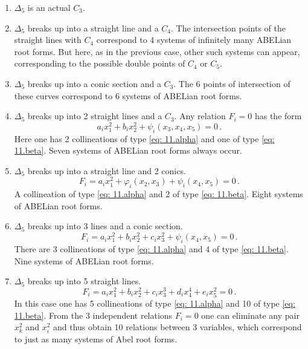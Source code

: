 \documentclass[leqno]{article}
\begin{document}
\begin{enumerate}[label=\arabic*)]
	\item $\Delta_5$ is an actual $C_3$.
	\item $\Delta_5$ breaks up into a straight line and a $C_4$. The intersection points of the straight lines with $C_4$ correspond to 4 systems of infinitely many ABELian root forms. But here, as in the previous case, other such systems can appear, corresponding to the possible double points of $C_4$ or $C_5$.
	\item $\Delta_5$ breaks up into a conic section and a $C_3$. The 6 points of intersection of these curves correspond to 6 systems of ABELian root forms.
	\item $\Delta_5$ breaks up into 2 straight lines and a $C_3$. Any relation $F_i=0$ has the form
	\begin{equation}\label{eq: 11.c}
	a_i x_1^2 + b_i x_2^2 + \psi_i(x_3, x_4, x_5) = 0 \, . \tag{c}
	\end{equation}
	Here one has 2 collineations of type \eqref{eq: 11.alpha} and one of type \eqref{eq: 11.beta}. Seven systems of ABELian root forms always occur.
	\item $\Delta_5$ breaks up into a straight line and 2 conics.
	\begin{equation}\label{eq: 11.d}
	    F_i = a_i x_1^2 + \varphi_i(x_2, x_3) + \psi_i(x_4, x_5) = 0 \, . \tag{d}
	\end{equation}
	A collineation of type \eqref{eq: 11.alpha} and 2 of type \eqref{eq: 11.beta}. Eight systems of ABELian root forms.
	\item $\Delta_5$ breaks up into 3 lines and a conic section.
	\begin{equation}\label{eq: 11.e}
	    F_i = a_i x_1^2 + b_i x_2^2 + c_i x_3^2 + \psi_i(x_4, x_5) = 0 \, . \tag{e}
	\end{equation}
	There are 3 collineations of type \eqref{eq: 11.alpha} and 4 of type \eqref{eq: 11.beta}. Nine systems of ABELian root forms.
	\item $\Delta_5$ breaks up into 5 straight lines. 
	\begin{equation}\label{eq: 11.f}
	F_i = a_i x_1^2 + b_i x_2^2 + c_i x_3^3 + d_i x_4^4 + e_i x_5^2 = 0 \, . \tag{f}
	\end{equation}
	In this case one has 5 collineations of type \eqref{eq: 11.alpha} and 10 of type \eqref{eq: 11.beta}. From the 3 independent relations $F_i=0$ one can eliminate any pair $x_k^2$ and $x_i^2$ and thus obtain 10 relations between 3 variables, which correspond to just as many systems of Abel root forms.
\end{enumerate}
\end{document}
